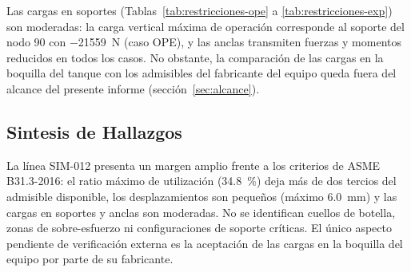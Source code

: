 Las cargas en soportes (Tablas~\ref{tab:restricciones-ope} a
\ref{tab:restricciones-exp}) son moderadas: la carga vertical m\'{a}xima de
operaci\'{o}n corresponde al soporte del nodo 90 con
\num{-21559}~\si{N} (caso OPE), y las anclas transmiten fuerzas y momentos
reducidos en todos los casos. No obstante, la comparaci\'{o}n de las cargas en
la boquilla del tanque con los admisibles del fabricante del equipo queda
fuera del alcance del presente informe (secci\'{o}n~\ref{sec:alcance}).

\subsection{Sintesis de Hallazgos}

La l\'{i}nea SIM-012 presenta un margen amplio frente a los criterios de
ASME B31.3-2016: el ratio m\'{a}ximo de utilizaci\'{o}n (34.8~\%) deja m\'{a}s
de dos tercios del admisible disponible, los desplazamientos son peque\~{n}os
(m\'{a}ximo 6.0~\si{mm}) y las cargas en soportes y anclas son moderadas. No se
identifican cuellos de
botella, zonas de sobre-esfuerzo ni configuraciones de soporte cr\'{i}ticas.
El \'{u}nico aspecto pendiente de verificaci\'{o}n externa es la aceptaci\'{o}n
de las cargas en la boquilla del equipo por parte de su fabricante.
